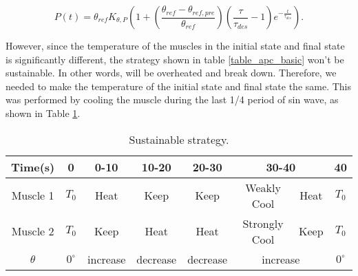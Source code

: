 \begin{equation} \label{power_derived}
P(t)=\theta_{ref}K_{\theta,P}\left(1+\left(\frac{\theta_{ref}-\theta_{ref,pre}}{\theta_{ref}}\right)\left(\frac{\tau}{\tau_{des}}-1\right)e^{-\frac{t}{\tau_{des}}}\right).
\end{equation}



However, since the temperature of the muscles in the initial state and final state is significantly different, the strategy shown in table \ref{table_apc_basic} won't be sustainable. In other words, \scps will be overheated and break down.
Therefore, we needed to make the temperature of the initial state and final state the same. This was performed by cooling the muscle during the last 1/4 period of sin wave, as shown in Table \ref{table_apc_sustain}.

\begin{table}[t]
	\caption{Sustainable \apc strategy.}
	\label{table_apc_sustain}
	\begin{center}
		\begin{tabular}{c||c|c|c|c|c|c|c}
			\hline
			Time(s) & 0 & 0-10 & 10-20 & 20-30 & \multicolumn{2}{|c|}{30-40} & 40 \\
			\hline
			Muscle 1 & $T_0$ & Heat & Keep & Keep & Weakly Cool & Heat & $T_0$ \\
			Muscle 2 & $T_0$ & Keep & Heat & Heat & Strongly Cool & Keep & $T_0$ \\
			\hline
			$\theta$ & $0^{\circ}$ & increase & decrease & decrease & \multicolumn{2}{|c|}{increase} & $0^{\circ}$ \\
			\hline
		\end{tabular}
	\end{center}
\end{table}